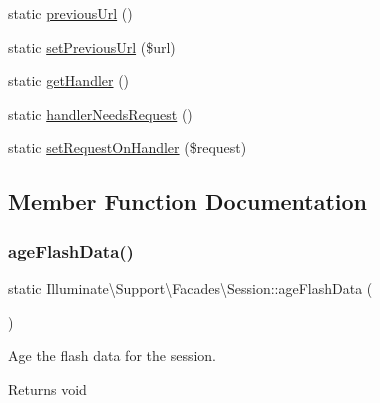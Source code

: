 \begin{DoxyCompactItemize}
\item 
static \mbox{\hyperlink{class_illuminate_1_1_support_1_1_facades_1_1_session_a5a52b7c3c04ae9b0904ef28f64f1c731}{previous\+Url}} ()
\item 
static \mbox{\hyperlink{class_illuminate_1_1_support_1_1_facades_1_1_session_ae1858487d8478d6eb0151d566ec9c203}{set\+Previous\+Url}} (\$url)
\item 
static \mbox{\hyperlink{class_illuminate_1_1_support_1_1_facades_1_1_session_ac90051582179a16433fb725479db8c15}{get\+Handler}} ()
\item 
static \mbox{\hyperlink{class_illuminate_1_1_support_1_1_facades_1_1_session_a1c94c838f6744a674facfe3b81971002}{handler\+Needs\+Request}} ()
\item 
static \mbox{\hyperlink{class_illuminate_1_1_support_1_1_facades_1_1_session_aed9f0e5263d665d5cdcc662a0134c1c9}{set\+Request\+On\+Handler}} (\$request)
\end{DoxyCompactItemize}


\subsection{Member Function Documentation}
\mbox{\label{class_illuminate_1_1_support_1_1_facades_1_1_session_a1b97cbfdfcab7ad5102446e3b00c453e}} 
\subsubsection{\texorpdfstring{age\+Flash\+Data()}{ageFlashData()}}
{\footnotesize\ttfamily static Illuminate\textbackslash{}\+Support\textbackslash{}\+Facades\textbackslash{}\+Session\+::age\+Flash\+Data (\begin{DoxyParamCaption}{ }\end{DoxyParamCaption})\hspace{0.3cm}{\ttfamily [static]}}

Age the flash data for the session.

\begin{DoxyReturn}{Returns}
void 
\end{DoxyReturn}
\mbox{\label{class_illuminate_1_1_support_1_1_facades_1_1_session_af8daa13884abd4dd348aa122faec5951}} 
